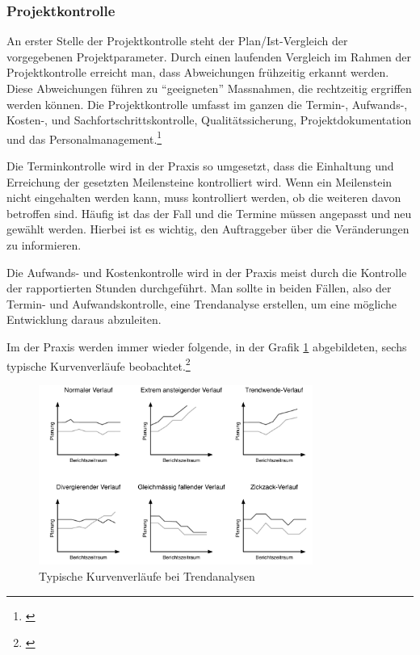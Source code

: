 
\subsubsection{Projektkontrolle}
An erster Stelle der Projektkontrolle steht der Plan/Ist-Vergleich der vorgegebenen
Projektparameter. Durch einen laufenden Vergleich im Rahmen der Projektkontrolle
erreicht man, dass Abweichungen frühzeitig erkannt werden. Diese Abweichungen
führen zu ``geeigneten'' Massnahmen, die rechtzeitig ergriffen werden können.
Die Projektkontrolle umfasst im ganzen die Termin-, Aufwands-, Kosten-, 
und Sachfortschrittskontrolle, Qualitätssicherung, Projektdokumentation und
das Personalmanagement.\footnote{\citealp*[Vgl.][S. 15]{burghardt2007einfuehrung}}

Die Terminkontrolle wird in der Praxis so umgesetzt, dass die Einhaltung
und Erreichung der gesetzten Meilensteine kontrolliert wird. Wenn ein 
Meilenstein nicht eingehalten werden kann, muss kontrolliert werden, ob die
weiteren davon betroffen sind. Häufig ist das der Fall und die Termine
müssen angepasst und neu gewählt werden. Hierbei ist es wichtig, den Auftraggeber
über die Veränderungen zu informieren.

Die Aufwands- und Kostenkontrolle wird in der Praxis meist durch die Kontrolle
der rapportierten Stunden durchgeführt. Man sollte in beiden Fällen, also der
Termin- und Aufwandskontrolle, eine Trendanalyse erstellen, um eine mögliche
Entwicklung daraus abzuleiten.

Im der Praxis werden immer wieder folgende, in der Grafik \ref{pic:06_trendanalyse}
abgebildeten, sechs typische Kurvenverläufe beobachtet.\footnote{\citealp*[Vgl.][S. 177 und S. 194]{burghardt2007einfuehrung}}

\begin{figure}[htbp]
\begin{center}
\includegraphics[width=0.8\textwidth,angle=0]{./bilder/theorie/06_trendanalyse.pdf}
\caption{Typische Kurvenverläufe bei Trendanalysen}
\label{pic:06_trendanalyse}
\end{center}
\end{figure}

